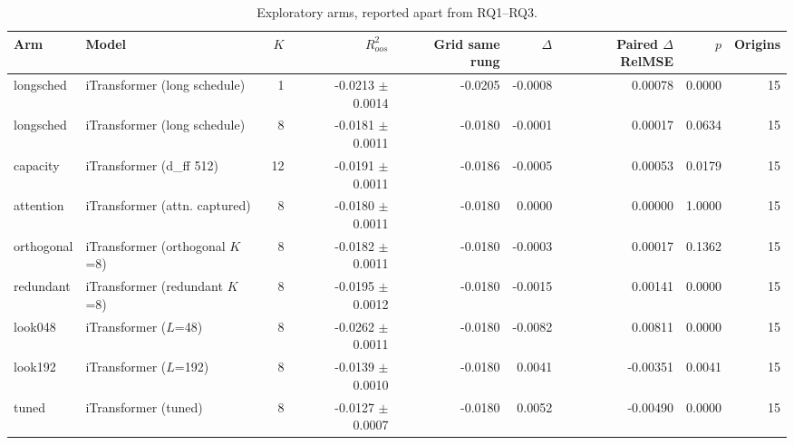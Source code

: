 \begin{table}[!t]
\centering
\caption{Exploratory arms, reported apart from RQ1--RQ3.}
\label{tab:robustness}
\begin{tabular}{llrrrrrrr}
\toprule
Arm & Model & $K$ & $R^2_{oos}$ & Grid same rung & $\Delta$ & Paired $\Delta$RelMSE & $p$ & Origins \\
\midrule
longsched & iTransformer (long schedule) & 1 & -0.0213 $\pm$ 0.0014 & -0.0205 & -0.0008 & 0.00078 & 0.0000 & 15 \\
longsched & iTransformer (long schedule) & 8 & -0.0181 $\pm$ 0.0011 & -0.0180 & -0.0001 & 0.00017 & 0.0634 & 15 \\
capacity & iTransformer (d\_ff 512) & 12 & -0.0191 $\pm$ 0.0011 & -0.0186 & -0.0005 & 0.00053 & 0.0179 & 15 \\
attention & iTransformer (attn. captured) & 8 & -0.0180 $\pm$ 0.0011 & -0.0180 & 0.0000 & 0.00000 & 1.0000 & 15 \\
orthogonal & iTransformer (orthogonal $K$=8) & 8 & -0.0182 $\pm$ 0.0011 & -0.0180 & -0.0003 & 0.00017 & 0.1362 & 15 \\
redundant & iTransformer (redundant $K$=8) & 8 & -0.0195 $\pm$ 0.0012 & -0.0180 & -0.0015 & 0.00141 & 0.0000 & 15 \\
look048 & iTransformer ($L$=48) & 8 & -0.0262 $\pm$ 0.0011 & -0.0180 & -0.0082 & 0.00811 & 0.0000 & 15 \\
look192 & iTransformer ($L$=192) & 8 & -0.0139 $\pm$ 0.0010 & -0.0180 & 0.0041 & -0.00351 & 0.0041 & 15 \\
tuned & iTransformer (tuned) & 8 & -0.0127 $\pm$ 0.0007 & -0.0180 & 0.0052 & -0.00490 & 0.0000 & 15 \\
\bottomrule
\end{tabular}

\end{table}
